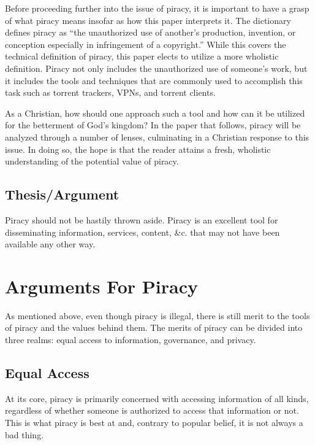 \documentclass[onecolumn, 12pt]{article}
\begin{document}
Before proceeding further into the issue of piracy, it is important to have a grasp of
what piracy means insofar as how this paper interprets it. The dictionary defines piracy
as ``the unauthorized use of another's production, invention, or conception especially in
infringement of a copyright.'' While this covers the technical definition of piracy, this
paper elects to utilize a more wholistic definition. Piracy not only includes the
unauthorized use of someone's work, but it includes the tools and techniques that are
commonly used to accomplish this task such as torrent trackers, VPNs, and torrent clients.

As a Christian, how should one approach such a tool and how can it be utilized for the
betterment of God's kingdom? In the paper that follows, piracy will be analyzed through a
number of lenses, culminating in a Christian response to this issue. In doing so, the hope
is that the reader attains a fresh, wholistic understanding of the potential value of
piracy.

\subsection{Thesis/Argument}

Piracy should not be hastily thrown aside.
Piracy is an excellent tool for disseminating information, services, content,
\&c. that may not have been available any other way.

\section{Arguments For Piracy}
As mentioned above, even though piracy is illegal, there is still merit to the tools of
piracy and the values behind them. The merits of piracy can be divided into three realms:
equal access to information, governance, and privacy. 
\subsection{Equal Access}
At its core, piracy is primarily concerned with accessing information of all kinds,
regardless of whether someone is authorized to access that information or not. This is
what piracy is best at and, contrary to popular belief, it is not always a bad thing. 
\end{document}
